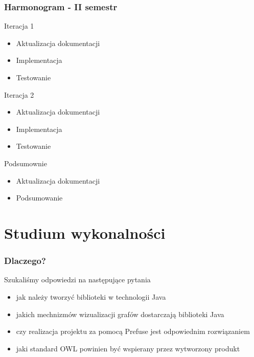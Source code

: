 \documentclass[xcolor=dvipsnames,9pt]{beamer}
\begin{document}
\begin{frame}
	\frametitle{Harmonogram - II semestr}
	\begin{block}{Iteracja 1}
	\begin{itemize}
 		\item Aktualizacja dokumentacji
		\item Implementacja
		\item Testowanie 
	\end{itemize}
	\end{block}
	\begin{block}{Iteracja 2}
	\begin{itemize}
 		\item Aktualizacja dokumentacji
		\item Implementacja
		\item Testowanie 
	\end{itemize}
	\end{block}
	\begin{block}{Podsumownie}
	\begin{itemize}
 		\item Aktualizacja dokumentacji
		\item Podsumowanie 
	\end{itemize}
	\end{block}
\end{frame}

\section{Studium wykonalności}

\begin{frame}
	\frametitle{Dlaczego?}
	\begin{block}{Szukaliśmy odpowiedzi na następujące pytania}
		\begin{itemize}
		    \item jak należy tworzyć biblioteki w technologii Java
		    \item jakich mechnizmów wizualizacji grafów dostarczają biblioteki Java
		    \item czy realizacja projektu za pomocą Prefuse jest odpowiednim rozwiązaniem
		    \item jaki standard OWL powinien być wspierany przez wytworzony produkt
		\end{itemize}
	\end{block}
\end{frame}
\end{document}
